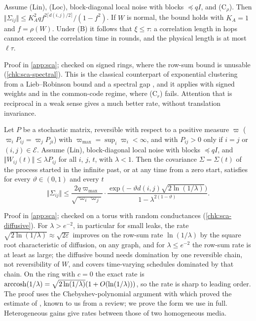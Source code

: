 \begin{proposition}\label{prop:sca-spectral}
Assume \textup{(Lin)}, \textup{(Loc)}, block-diagonal local noise with blocks $\preceq qI$, and \textup{(C$_\rho$)}. Then $\Vert\Sigma_{ij}\Vert\le K_A^2qf^{2\lceil d(i,j)/2\rceil}/(1-f^2)$. If $W$ is normal, the bound holds with $K_A=1$ and $f=\rho(W)$. Under \textup{(B)} it follows that $\xi\le\tau$: a correlation length in hops cannot exceed the correlation time in rounds, and the physical length is at most $\ell\tau$.
\end{proposition}
Proof in \cref{app:sca}; checked on signed rings, where the row-sum bound is unusable (\cref{chk:sca-spectral}). This is the classical counterpart of exponential clustering from a Lieb--Robinson bound and a spectral gap \citep{hastings2004locality,nachtergaele2006lieb,hastings2006spectral}, and it applies with signed weights and in the common-code regime, where \textup{(C$_r$)} fails. Attention that is reciprocal in a weak sense gives a much better rate, without translation invariance.

\begin{theorem}\label{thm:sca-diffusive}
Let $P$ be a stochastic matrix, reversible with respect to a positive measure $\varpi$ ($\varpi_iP_{ij}=\varpi_jP_{ji}$) with $\varpi_{\max}=\sup_i\varpi_i<\infty$, and with $P_{ij}>0$ only if $i=j$ or $(i,j)\in\mathcal E$. Assume \textup{(Lin)}, block-diagonal local noise with blocks $\preceq qI$, and $\Vert W_{ij}(t)\Vert\le\lambda P_{ij}$ for all $i$, $j$, $t$, with $\lambda<1$. Then the covariance $\Sigma=\Sigma(t)$ of the process started in the infinite past, or at any time from a zero start, satisfies for every $\vartheta\in(0,1)$ and every $t$
\begin{equation}\label{eq:sca-diffusive}
\Vert\Sigma_{ij}\Vert\le\frac{2q\varpi_{\max}}{\sqrt{\varpi_i\varpi_j}}\cdot\frac{\exp\bigl(-\vartheta d(i,j)\sqrt{2\ln(1/\lambda)}\bigr)}{1-\lambda^{2(1-\vartheta)}}.
\end{equation}
\end{theorem}
Proof in \cref{app:sca}; checked on a torus with random conductances (\cref{chk:sca-diffusive}). For $\lambda>e^{-2}$, in particular for small leaks, the rate $\sqrt{2\ln(1/\lambda)}\approx\sqrt{2\varepsilon}$ improves on the row-sum rate $\ln(1/\lambda)$ by the square root characteristic of diffusion, on any graph, and for $\lambda\le e^{-2}$ the row-sum rate is at least as large; the diffusive bound needs domination by one reversible chain, not reversibility of $W$, and covers time-varying schedules dominated by that chain. On the ring with $c=0$ the exact rate is $\operatorname{arccosh}(1/\lambda)=\sqrt{2\ln(1/\lambda)}(1+O(\ln(1/\lambda)))$, so the rate is sharp to leading order. The proof uses the Chebyshev-polynomial argument with which \citet{carne1985transmutation} proved the estimate of \citet{varopoulos1985long}, known to us from a review; we prove the form we use in full. Heterogeneous gains give rates between those of two homogeneous media.


